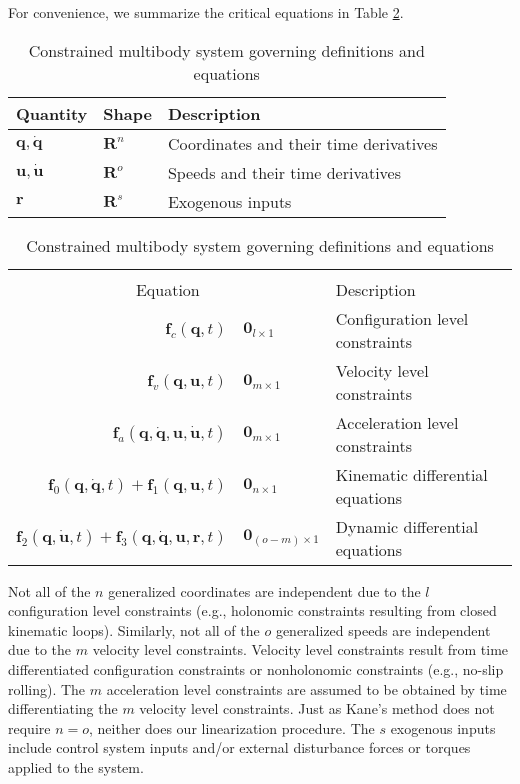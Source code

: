 \documentclass[smallcondensed,final]{svjour3}                     %
\begin{document}
For convenience, we summarize the critical equations in Table
\ref{table:assumptions}.


\begin{table}[htbp]
  \centering
  \caption{Constrained multibody system governing definitions and equations}
  \label{table:assumptions}
  \begin{tabular}[c]{l l l}
    Quantity & Shape & Description\\
    \hline
    $\bm{q},\bm{\dot{q}}$ & $\mathbf{R}^n$ & Coordinates and their time
    derivatives\\
    $\bm{u}, \bm{\dot{u}}$ & $\mathbf{R}^o$ & Speeds and their time derivatives\\
    $\bm{r}$ & $\mathbf{R}^s$ & Exogenous inputs \\
  \end{tabular}
  \begin{tabular}[c]{r @{ $=$ } l l}
    \multicolumn{3}{c}{ } \\
    \multicolumn{2}{c}{Equation} & Description \\
    \hline
    $\bm{f}_{c}(\bm{q}, t)$ & $\bm{0}_{l \times 1}$ & Configuration level constraints \\
    $\bm{f}_{v}(\bm{q}, \bm{u}, t)$ & $\bm{0}_{m \times 1}$ & Velocity level constraints \\
    $\bm{f}_{a}(\bm{q}, \bm{\dot{q}}, \bm{u}, \bm{\dot{u}}, t)$ & $\bm{0}_{m
    \times 1}$ & Acceleration level constraints \\
    $\bm{f}_{0}(\bm{q}, \bm{\dot{q}}, t) + \bm{f}_{1}(\bm{q}, \bm{u}, t)$ &
    $\bm{0}_{n \times 1}$ & Kinematic differential equations \\
    $\bm{f}_{2}(\bm{q}, \bm{\dot{u}}, t) + \bm{f}_{3}(\bm{q}, \bm{\dot{q}},
    \bm{u}, \bm{r}, t)$ & $\bm{0}_{(o - m) \times 1}$ & Dynamic differential equations
  \end{tabular}
\end{table}

Not all of the $n$ generalized coordinates are independent due to the $l$
configuration level constraints (e.g., holonomic constraints resulting from
closed kinematic loops). Similarly, not all of the $o$ generalized speeds are
independent due to the $m$ velocity level constraints.  Velocity level
constraints result from time differentiated configuration constraints or
nonholonomic constraints (e.g., no-slip rolling).  The $m$ acceleration level
constraints are assumed to be obtained by time differentiating the $m$ velocity
level constraints.  Just as Kane's method does not require $n = o$,
neither does our linearization procedure. The $s$ exogenous inputs include
control system inputs and/or external disturbance forces or torques applied to
the system.
\end{document}
